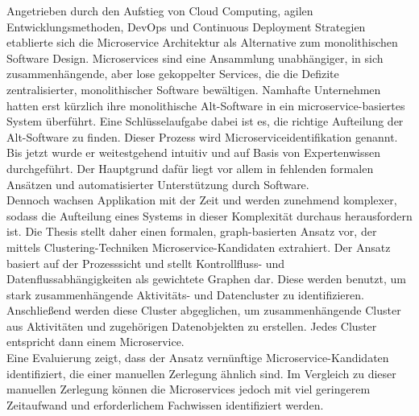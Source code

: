 
\Abstract
Angetrieben durch den Aufstieg von Cloud Computing, agilen Entwicklungsmethoden, DevOps und Continuous Deployment Strategien etablierte sich die Microservice Architektur als Alternative zum monolithischen Software Design. Microservices sind eine Ansammlung unabhängiger, in sich zusammenhängende, aber lose gekoppelter Services, die die Defizite zentralisierter, monolithischer Software bewältigen. Namhafte Unternehmen hatten erst kürzlich ihre monolithische Alt-Software in ein microservice-basiertes System überführt. Eine Schlüsselaufgabe dabei ist es, die richtige Aufteilung der Alt-Software zu finden. Dieser Prozess wird Microserviceidentifikation genannt. Bis jetzt wurde er weitestgehend intuitiv und auf Basis von Expertenwissen durchgeführt. Der Hauptgrund dafür liegt vor allem in fehlenden formalen Ansätzen und automatisierter Unterstützung durch Software.\\
Dennoch wachsen Applikation mit der Zeit und werden zunehmend komplexer, sodass die Aufteilung eines Systems in dieser Komplexität durchaus herausfordern ist. Die Thesis stellt daher einen formalen, graph-basierten Ansatz vor, der mittels Clustering-Techniken Microservice-Kandidaten extrahiert. Der Ansatz basiert auf der Prozesssicht und stellt Kontrollfluss- und Datenflussabhängigkeiten als gewichtete Graphen dar. Diese werden benutzt, um stark zusammenhängende Aktivitäts- und Datencluster zu identifizieren. Anschließend werden diese Cluster abgeglichen, um zusammenhängende Cluster aus Aktivitäten und zugehörigen Datenobjekten zu erstellen. Jedes Cluster entspricht dann einem Microservice. \\
Eine Evaluierung zeigt, dass der Ansatz vernünftige Microservice-Kandidaten identifiziert, die einer manuellen Zerlegung ähnlich sind. Im Vergleich zu dieser manuellen Zerlegung können die Microservices jedoch mit viel geringerem Zeitaufwand und erforderlichem Fachwissen identifiziert werden.

